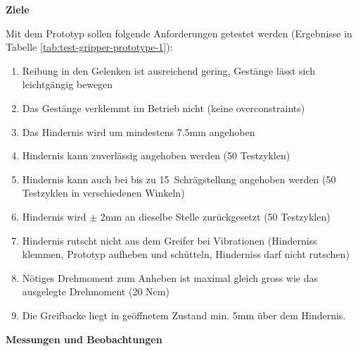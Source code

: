 \textbf{Ziele}

Mit dem Prototyp sollen folgende Anforderungen getestet werden (Ergebnisse in Tabelle \ref{tab:test-gripper-prototype-1}):
\begin{enumerate}
    \item Reibung in den Gelenken ist ausreichend gering, Gestänge lässt sich leichtgängig bewegen
    \item Das Gestänge verklemmt im Betrieb nicht (keine overconstraints)
    \item Das Hindernis wird um mindestens 7.5mm angehoben
    \item Hindernis kann zuverlässig angehoben werden (50 Testzyklen)
    \item Hindernis kann auch bei bis zu 15\textdegree\ Schrägstellung angehoben werden (50 Testzyklen in verschiedenen Winkeln)
    \item Hindernis wird $\pm$ 2mm an dieselbe Stelle zurückgesetzt (50 Testzyklen)
    \item Hindernis rutscht nicht aus dem Greifer bei Vibrationen (Hinderniss klemmen, Prototyp aufheben und schütteln, Hinderniss darf nicht rutschen)
    \item Nötiges Drehmoment zum Anheben ist maximal gleich gross wie das ausgelegte Drehmoment (20 Ncm)
    \item Die Greifbacke liegt in geöffnetem Zustand min. 5mm über dem Hindernis.
\end{enumerate}
\newpage

\textbf{Messungen und Beobachtungen}

